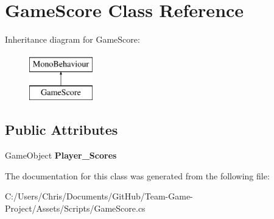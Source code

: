 \hypertarget{class_game_score}{}\section{Game\+Score Class Reference}
\label{class_game_score}
Inheritance diagram for Game\+Score\+:\begin{figure}[H]
\begin{center}
\leavevmode
\includegraphics[height=2.000000cm]{class_game_score}
\end{center}
\end{figure}
\subsection*{Public Attributes}
\begin{DoxyCompactItemize}
\item 
Game\+Object {\bfseries Player\+\_\+\+Scores}\hypertarget{class_game_score_a334a7bf1f71c7298207088b794ba3534}{}\label{class_game_score_a334a7bf1f71c7298207088b794ba3534}

\end{DoxyCompactItemize}


The documentation for this class was generated from the following file\+:\begin{DoxyCompactItemize}
\item 
C\+:/\+Users/\+Chris/\+Documents/\+Git\+Hub/\+Team-\/\+Game-\/\+Project/\+Assets/\+Scripts/Game\+Score.\+cs\end{DoxyCompactItemize}

